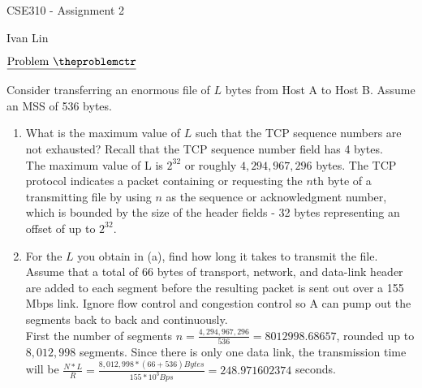 \documentclass[11pt]{article}
\def\pp{\par\noindent}
\begin{document}
\centerline{CSE310 - Assignment 2}
\centerline{Ivan Lin}
\bigskip


\addtocounter{problemctr}{1}
\bigskip
\noindent
$\underline{\rm Problem\ \theproblemctr}$\pp
Consider transferring an enormous file of $L$ bytes from Host A to Host B. Assume an MSS of 536 bytes.
\begin{enumerate}
    \item What is the maximum value of $L$ such that the TCP sequence numbers are not exhausted? Recall that the TCP sequence number field has 4 bytes.\\
    The maximum value of L is $2^{32}$ or roughly $4,294,967,296$ bytes. The TCP protocol indicates a packet containing or requesting the $n$th byte of a transmitting file by using $n$ as the sequence or acknowledgment number, which is bounded by the size of the header fields - 32 bytes representing an offset of up to $2^32$.
    \item For the $L$ you obtain in (a), find how long it takes to transmit the file. Assume that a total of 66 bytes of transport, network, and data-link header are added to each segment before the resulting packet is sent out over a 155 Mbps link. Ignore flow control and congestion control so A can pump out the segments back to back and continuously.\\
    First the number of segments $n=\frac{4,294,967,296}{536}=8012998.68657$, rounded up to $8,012,998$ segments.
    Since there is only one data link, the transmission time will be $\frac{N*L}{R}=\frac{8,012,998*(66+536) Bytes}{155*10^3 Bps}=248.971602374$ seconds.
\end{enumerate}
\end{document}

